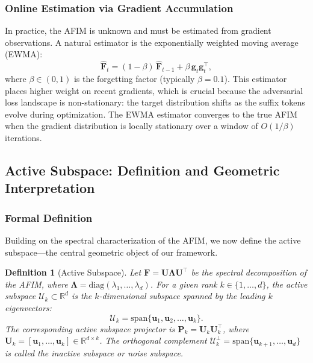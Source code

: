 ﻿\documentclass[lettersize,journal]{IEEEtran}
\newtheorem{definition}{Definition}
\begin{document}
\subsubsection{Online Estimation via Gradient Accumulation}

In practice, the AFIM is unknown and must be estimated from gradient observations. A natural estimator is the exponentially weighted moving average (EWMA):
\begin{equation}
\label{eq:ewma}
\hat{\mathbf{F}}_t = (1 - \beta) \, \hat{\mathbf{F}}_{t-1} + \beta \, \mathbf{g}_t \mathbf{g}_t^\top,
\end{equation}
where $\beta \in (0, 1)$ is the forgetting factor (typically $\beta = 0.1$). This estimator places higher weight on recent gradients, which is crucial because the adversarial loss landscape is non-stationary: the target distribution shifts as the suffix tokens evolve during optimization. The EWMA estimator converges to the true AFIM when the gradient distribution is locally stationary over a window of $O(1/\beta)$ iterations.

\subsection{Active Subspace: Definition and Geometric Interpretation}
\label{sec:active_subspace}

\subsubsection{Formal Definition}

Building on the spectral characterization of the AFIM, we now define the active subspace---the central geometric object of our framework.

\begin{definition}[Active Subspace]
\label{def:active_subspace}
Let $\mathbf{F} = \mathbf{U} \boldsymbol{\Lambda} \mathbf{U}^\top$ be the spectral decomposition of the AFIM, where $\boldsymbol{\Lambda} = \text{diag}(\lambda_1, \ldots, \lambda_d)$. For a given rank $k \in \{1, \ldots, d\}$, the \emph{active subspace} $\mathcal{U}_k \subset \mathbb{R}^d$ is the $k$-dimensional subspace spanned by the leading $k$ eigenvectors:
\begin{equation}
\label{eq:active_subspace}
\mathcal{U}_k = \text{span}\{\mathbf{u}_1, \mathbf{u}_2, \ldots, \mathbf{u}_k\}.
\end{equation}
The corresponding \emph{active subspace projector} is $\mathbf{P}_k = \mathbf{U}_k \mathbf{U}_k^\top$, where $\mathbf{U}_k = [\mathbf{u}_1, \ldots, \mathbf{u}_k] \in \mathbb{R}^{d \times k}$. The orthogonal complement $\mathcal{U}_k^\perp = \text{span}\{\mathbf{u}_{k+1}, \ldots, \mathbf{u}_d\}$ is called the \emph{inactive subspace} or \emph{noise subspace}.
\end{definition}
\end{document}
